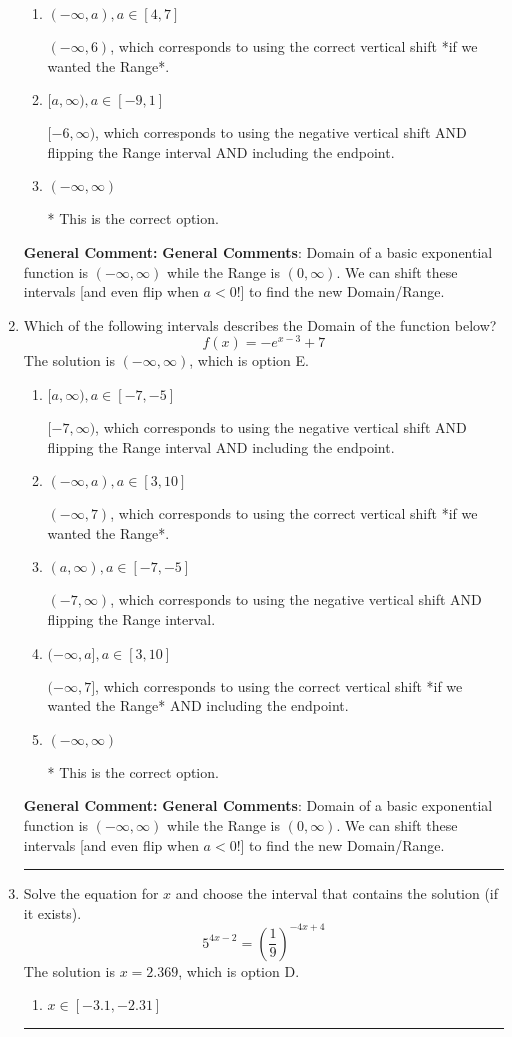 \documentclass{extbook}[14pt]
\newcommand{\litem}[1]{\item #1

\rule{\textwidth}{0.4pt}}
\begin{document}
\begin{enumerate}
{\begin{enumerate}[label=\Alph*.]
$(-6, \infty)$, which corresponds to using the negative vertical shift AND flipping the Range interval.
\item \( (-\infty, a), a \in [4, 7] \)

$(-\infty, 6)$, which corresponds to using the correct vertical shift *if we wanted the Range*.
\item \( [a, \infty), a \in [-9, 1] \)

$[-6, \infty)$, which corresponds to using the negative vertical shift AND flipping the Range interval AND including the endpoint.
\item \( (-\infty, \infty) \)

* This is the correct option.
\end{enumerate}

\textbf{General Comment:} \textbf{General Comments}: Domain of a basic exponential function is $(-\infty, \infty)$ while the Range is $(0, \infty)$. We can shift these intervals [and even flip when $a<0$!] to find the new Domain/Range.
}
\litem{
Which of the following intervals describes the Domain of the function below?
\[ f(x) = -e^{x-3}+7 \]The solution is \( (-\infty, \infty) \), which is option E.\begin{enumerate}[label=\Alph*.]
\item \( [a, \infty), a \in [-7, -5] \)

$[-7, \infty)$, which corresponds to using the negative vertical shift AND flipping the Range interval AND including the endpoint.
\item \( (-\infty, a), a \in [3, 10] \)

$(-\infty, 7)$, which corresponds to using the correct vertical shift *if we wanted the Range*.
\item \( (a, \infty), a \in [-7, -5] \)

$(-7, \infty)$, which corresponds to using the negative vertical shift AND flipping the Range interval.
\item \( (-\infty, a], a \in [3, 10] \)

$(-\infty, 7]$, which corresponds to using the correct vertical shift *if we wanted the Range* AND including the endpoint.
\item \( (-\infty, \infty) \)

* This is the correct option.
\end{enumerate}

\textbf{General Comment:} \textbf{General Comments}: Domain of a basic exponential function is $(-\infty, \infty)$ while the Range is $(0, \infty)$. We can shift these intervals [and even flip when $a<0$!] to find the new Domain/Range.
}
\litem{
Solve the equation for $x$ and choose the interval that contains the solution (if it exists).
\[ 5^{4x-2} = \left(\frac{1}{9}\right)^{-4x+4} \]The solution is \( x = 2.369 \), which is option D.\begin{enumerate}[label=\Alph*.]
\item \( x \in [-3.1, -2.31] \)


\end{enumerate}}
\end{enumerate}
\end{document}
